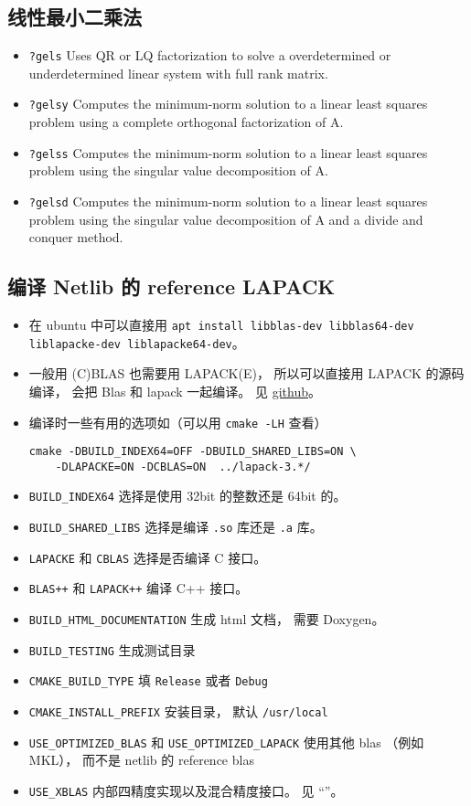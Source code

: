 \subsection{线性最小二乘法}
\begin{itemize}
\item \verb`?gels` Uses QR or LQ factorization to solve a overdetermined or underdetermined linear system with full rank matrix.
\item \verb`?gelsy` Computes the minimum-norm solution to a linear least squares problem using a complete orthogonal factorization of A.
\item \verb`?gelss` Computes the minimum-norm solution to a linear least squares problem using the singular value decomposition of A.
\item \verb`?gelsd` Computes the minimum-norm solution to a linear least squares problem using the singular value decomposition of A and a divide and conquer method.
\end{itemize}

\subsection{编译 Netlib 的 reference LAPACK}
\begin{itemize}
\item 在 ubuntu 中可以直接用 \verb`apt install libblas-dev libblas64-dev liblapacke-dev liblapacke64-dev`。
\item 一般用 (C)BLAS 也需要用 LAPACK(E)， 所以可以直接用 LAPACK 的源码编译， 会把 Blas 和 lapack 一起编译。 见 \href{https://github.com/Reference-LAPACK/lapack/}{github}。
\item 编译时一些有用的选项如（可以用 \verb`cmake -LH` 查看）
\begin{lstlisting}[language=none]
cmake -DBUILD_INDEX64=OFF -DBUILD_SHARED_LIBS=ON \
    -DLAPACKE=ON -DCBLAS=ON  ../lapack-3.*/
\end{lstlisting}
\item \verb`BUILD_INDEX64` 选择是使用 32bit 的整数还是 64bit 的。
\item \verb`BUILD_SHARED_LIBS` 选择是编译 \verb`.so` 库还是 \verb`.a` 库。
\item \verb`LAPACKE` 和 \verb`CBLAS` 选择是否编译 C 接口。
\item \verb`BLAS++` 和 \verb`LAPACK++` 编译 C++ 接口。
\item \verb`BUILD_HTML_DOCUMENTATION` 生成 html 文档， 需要 Doxygen。
\item \verb`BUILD_TESTING` 生成测试目录
\item \verb`CMAKE_BUILD_TYPE` 填 \verb`Release` 或者 \verb`Debug`
\item \verb`CMAKE_INSTALL_PREFIX` 安装目录， 默认 \verb`/usr/local`
\item \verb`USE_OPTIMIZED_BLAS` 和 \verb`USE_OPTIMIZED_LAPACK` 使用其他 blas （例如 MKL）， 而不是 netlib 的 reference blas
\item \verb`USE_XBLAS` 内部四精度实现以及混合精度接口。 见 “\enref{BLAS 简介}{BLAS}”。
\end{itemize}

